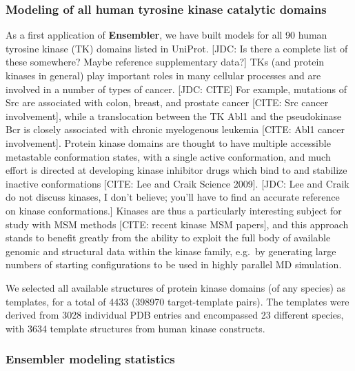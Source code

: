 \documentclass[aps,pre,twocolumn,nofootinbib,superscriptaddress,linenumbers]{revtex4-1}
\begin{document}
\subsubsection*{Modeling of all human tyrosine kinase catalytic domains}

As a first application of {\bf Ensembler}, we have built models for all 90 human tyrosine kinase (TK) domains listed in UniProt.
{\color{red}[JDC: Is there a complete list of these somewhere?  Maybe reference supplementary data?]}
TKs (and protein kinases in general) play important roles in many cellular processes and are involved in a number of types of cancer.
{\color{red}[JDC: CITE]}
For example, mutations of Src are associated with colon, breast, and prostate cancer {\color{red}[CITE: Src cancer involvement]}, while a translocation between the TK Abl1 and the pseudokinase Bcr is closely associated with chronic myelogenous leukemia {\color{red}[CITE: Abl1 cancer involvement]}.
Protein kinase domains are thought to have multiple accessible metastable conformation states, with a single active conformation, and much effort is directed at developing kinase inhibitor drugs which bind to and stabilize inactive conformations [CITE: Lee and Craik Science 2009].
{\color{red}[JDC: Lee and Craik do not discuss kinases, I don't believe; you'll have to find an accurate reference on kinase conformations.]}
Kinases are thus a particularly interesting subject for study with MSM methods [CITE: recent kinase MSM papers], and this approach stands to benefit greatly from the ability to exploit the full body of available genomic and structural data within the kinase family, e.g.~by generating large numbers of starting configurations to be used in highly parallel MD simulation.

We selected all available structures of protein kinase domains (of any species) as templates, for a total of 4433 (\num{398970} target-template pairs).
The templates were derived from 3028 individual PDB entries and encompassed 23 different species, with 3634 template structures from human kinase constructs.

\subsubsection*{Ensembler modeling statistics}
\end{document}
